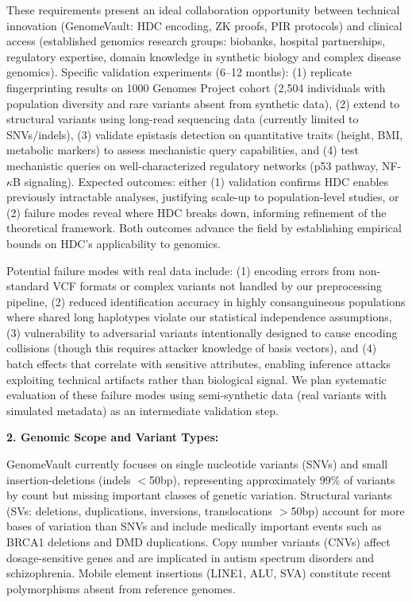 \documentclass[11pt,letterpaper]{article}
\begin{document}
These requirements present an ideal collaboration opportunity between technical innovation (GenomeVault: HDC encoding, ZK proofs, PIR protocols) and clinical access (established genomics research groups: biobanks, hospital partnerships, regulatory expertise, domain knowledge in synthetic biology and complex disease genomics). Specific validation experiments (6--12 months): (1) replicate fingerprinting results on 1000 Genomes Project cohort (2,504 individuals with population diversity and rare variants absent from synthetic data), (2) extend to structural variants using long-read sequencing data (currently limited to SNVs/indels), (3) validate epistasis detection on quantitative traits (height, BMI, metabolic markers) to assess mechanistic query capabilities, and (4) test mechanistic queries on well-characterized regulatory networks (p53 pathway, NF-$\kappa$B signaling). Expected outcomes: either (1) validation confirms HDC enables previously intractable analyses, justifying scale-up to population-level studies, or (2) failure modes reveal where HDC breaks down, informing refinement of the theoretical framework. Both outcomes advance the field by establishing empirical bounds on HDC's applicability to genomics.

Potential failure modes with real data include: (1) encoding errors from non-standard VCF formats or complex variants not handled by our preprocessing pipeline, (2) reduced identification accuracy in highly consanguineous populations where shared long haplotypes violate our statistical independence assumptions, (3) vulnerability to adversarial variants intentionally designed to cause encoding collisions (though this requires attacker knowledge of basis vectors), and (4) batch effects that correlate with sensitive attributes, enabling inference attacks exploiting technical artifacts rather than biological signal. We plan systematic evaluation of these failure modes using semi-synthetic data (real variants with simulated metadata) as an intermediate validation step.

\textbf{2. Genomic Scope and Variant Types:}

GenomeVault currently focuses on single nucleotide variants (SNVs) and small insertion-deletions (indels $<$50bp), representing approximately 99\% of variants by count but missing important classes of genetic variation. Structural variants (SVs: deletions, duplications, inversions, translocations $>$50bp) account for more bases of variation than SNVs and include medically important events such as BRCA1 deletions and DMD duplications. Copy number variants (CNVs) affect dosage-sensitive genes and are implicated in autism spectrum disorders and schizophrenia. Mobile element insertions (LINE1, ALU, SVA) constitute recent polymorphisms absent from reference genomes.
\end{document}
